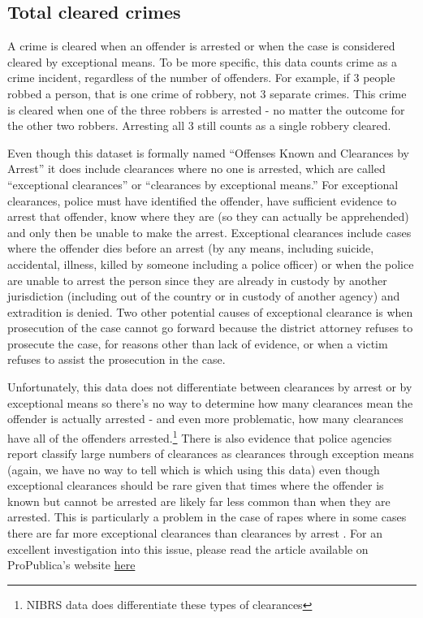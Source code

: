 \documentclass[
  12pt,
  openany]{book}
\begin{document}
\hypertarget{total-cleared-crimes}{%
\subsection{Total cleared crimes}\label{total-cleared-crimes}}

A crime is cleared when an offender is arrested or when the case is considered cleared by exceptional means. To be more specific, this data counts crime as a crime incident, regardless of the number of offenders. For example, if 3 people robbed a person, that is one crime of robbery, not 3 separate crimes. This crime is cleared when one of the three robbers is arrested - no matter the outcome for the other two robbers. Arresting all 3 still counts as a single robbery cleared.

Even though this dataset is formally named ``Offenses Known and Clearances by Arrest'' it does include clearances where no one is arrested, which are called ``exceptional clearances'' or ``clearances by exceptional means.'' For exceptional clearances, police must have identified the offender, have sufficient evidence to arrest that offender, know where they are (so they can actually be apprehended) and only then be unable to make the arrest. Exceptional clearances include cases where the offender dies before an arrest (by any means, including suicide, accidental, illness, killed by someone including a police officer) or when the police are unable to arrest the person since they are already in custody by another jurisdiction (including out of the country or in custody of another agency) and extradition is denied. Two other potential causes of exceptional clearance is when prosecution of the case cannot go forward because the district attorney refuses to prosecute the case, for reasons other than lack of evidence, or when a victim refuses to assist the prosecution in the case.

Unfortunately, this data does not differentiate between clearances by arrest or by exceptional means so there's no way to determine how many clearances mean the offender is actually arrested - and even more problematic, how many clearances have all of the offenders arrested.\footnote{NIBRS data does differentiate these types of clearances} There is also evidence that police agencies report classify large numbers of clearances as clearances through exception means (again, we have no way to tell which is which using this data) even though exceptional clearances should be rare given that times where the offender is known but cannot be arrested are likely far less common than when they are arrested. This is particularly a problem in the case of rapes where in some cases there are far more exceptional clearances than clearances by arrest \citep{yeung2018comes}. For an excellent investigation into this issue, please read the \citet{yeung2018comes} article available on ProPublica's website \href{https://www.propublica.org/article/when-it-comes-to-rape-just-because-a-case-is-cleared-does-not-mean-solved}{here}
\end{document}

